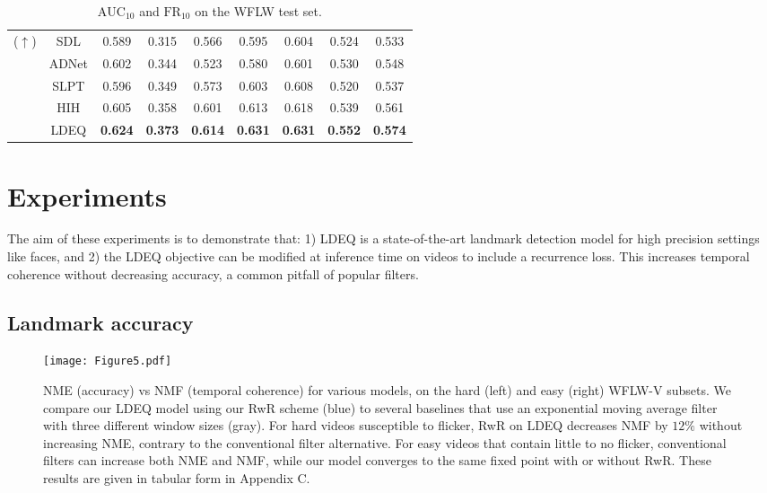 \documentclass[10pt,twocolumn,letterpaper]{article}
\begin{document}
\begin{table}[b!]
{\begin{tabular}{@{}c|c|ccccccc@{}}
            ($\uparrow$)   & SDL & 0.589 & 0.315 & 0.566 & 0.595 & 0.604 & 0.524 & 0.533 \\
                           & ADNet & 0.602 & 0.344 & 0.523 & 0.580 & 0.601 & 0.530 & 0.548 \\
                           & SLPT & 0.596 & 0.349 & 0.573 & 0.603 & 0.608 & 0.520 & 0.537 \\
                           & HIH & 0.605 & 0.358 & 0.601 & 0.613 & 0.618 & 0.539 & 0.561 \\
    \cmidrule{2-9}
    & LDEQ & \textbf{0.624} & \textbf{0.373} & \textbf{0.614} & \textbf{0.631} & \textbf{0.631} & \textbf{0.552} & \textbf{0.574}\\
    \bottomrule
  \end{tabular}
  }
  \caption{$\text{AUC}_{10}$ and $\text{FR}_{10}$ on the WFLW test set.}
  \label{tab:WFLW performance AUC FR}
\end{table}

\section{Experiments}

The aim of these experiments is to demonstrate that: 1) LDEQ is a state-of-the-art landmark detection model for high precision settings like faces, and 2) the LDEQ objective can be modified at inference time on videos to include a recurrence loss. This increases temporal coherence without decreasing accuracy, a common pitfall of popular filters. 

\subsection{Landmark accuracy}

\begin{figure*}[t!]
  \centering
   \texttt{[image: Figure5.pdf]}
   \caption{NME (accuracy) vs NMF (temporal coherence) for various models, on the hard (left) and easy (right) WFLW-V subsets. We compare our LDEQ model using our RwR scheme (blue) to several baselines that use an exponential moving average filter with three different window sizes (gray). For hard videos susceptible to flicker, RwR on LDEQ decreases NMF by $12\%$ without increasing NME, contrary to the conventional filter alternative. For easy videos that contain little to no flicker, conventional filters can increase both NME and NMF, while our model converges to the same fixed point with or without RwR. These results are given in tabular form in Appendix C.} 
   \label{fig:NMEvsNMF}
\end{figure*}
\end{document}
